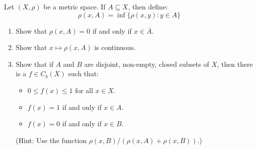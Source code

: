 \documentclass[12pt]{article}
\begin{document}
\newpage

\begin{problem}{3}
    Let $(X, \rho)$ be a metric space. If $A \subseteq X$, then define: 
    \[ \rho(x, A) = \inf\{\rho(x,y) : y \in A\}\]
    \begin{enumerate}
        \item Show that $\rho(x,A) = 0$ if and only if $x \in \overline{A}$.
        \item Show that $x \mapsto \rho(x,A)$ is continuous.
        \item Show that if $A$ and $B$ are disjoint, non-empty, closed subsets of $X$, then there is a $f \in C_b(X)$ such that:
        \begin{itemize}
            \item $0 \leq f(x) \leq 1$ for all $x \in X$.
            \item $f(x) = 1$ if and only if $x \in A$.
            \item $f(x) = 0$ if and only if $x \in B$. 
        \end{itemize}
        (Hint: Use the function $\rho(x,B)/(\rho(x, A)+\rho(x, B))$.)
    \end{enumerate} 
\end{problem}
\end{document}
